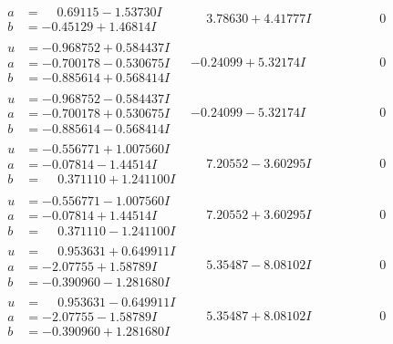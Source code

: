 \documentclass[1p]{elsarticle_modified}
\theoremstyle{definition}
\begin{document}
$$\begin{array}{c|c|c}
\begin{aligned}
a &= \phantom{-}0.69115 - 1.53730 I \\
b &= -0.45129 + 1.46814 I\end{aligned}
 & \phantom{-}3.78630 + 4.41777 I & \phantom{-0.000000 } 0 \\ \hline\begin{aligned}
u &= -0.968752 + 0.584437 I \\
a &= -0.700178 - 0.530675 I \\
b &= -0.885614 + 0.568414 I\end{aligned}
 & -0.24099 + 5.32174 I & \phantom{-0.000000 } 0 \\ \hline\begin{aligned}
u &= -0.968752 - 0.584437 I \\
a &= -0.700178 + 0.530675 I \\
b &= -0.885614 - 0.568414 I\end{aligned}
 & -0.24099 - 5.32174 I & \phantom{-0.000000 } 0 \\ \hline\begin{aligned}
u &= -0.556771 + 1.007560 I \\
a &= -0.07814 - 1.44514 I \\
b &= \phantom{-}0.371110 + 1.241100 I\end{aligned}
 & \phantom{-}7.20552 - 3.60295 I & \phantom{-0.000000 } 0 \\ \hline\begin{aligned}
u &= -0.556771 - 1.007560 I \\
a &= -0.07814 + 1.44514 I \\
b &= \phantom{-}0.371110 - 1.241100 I\end{aligned}
 & \phantom{-}7.20552 + 3.60295 I & \phantom{-0.000000 } 0 \\ \hline\begin{aligned}
u &= \phantom{-}0.953631 + 0.649911 I \\
a &= -2.07755 + 1.58789 I \\
b &= -0.390960 - 1.281680 I\end{aligned}
 & \phantom{-}5.35487 - 8.08102 I & \phantom{-0.000000 } 0 \\ \hline\begin{aligned}
u &= \phantom{-}0.953631 - 0.649911 I \\
a &= -2.07755 - 1.58789 I \\
b &= -0.390960 + 1.281680 I\end{aligned}
 & \phantom{-}5.35487 + 8.08102 I & \phantom{-0.000000 } 0 \\ \hline\begin{aligned}

\end{aligned}
\end{array}$$
\end{document}
